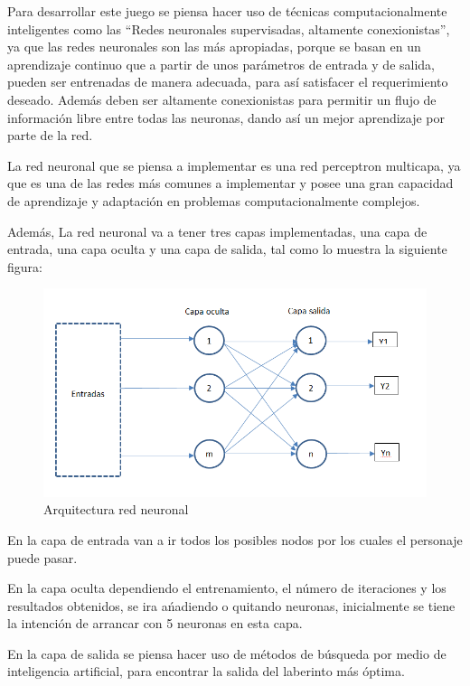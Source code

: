\documentclass{article}%
\begin{document}
Para desarrollar este juego se piensa hacer uso de  t\'ecnicas computacionalmente inteligentes  como las “Redes neuronales supervisadas, altamente conexionistas”, ya que  las redes neuronales son las m\'as apropiadas, porque se basan en un aprendizaje continuo que a partir de unos par\'ametros de entrada y de salida, pueden ser entrenadas de manera adecuada, para as\'i satisfacer el requerimiento deseado. Adem\'as deben ser  altamente conexionistas para permitir un flujo de informaci\'on libre entre todas las neuronas, dando as\'i un mejor aprendizaje por parte de la red.

La red neuronal que se piensa a implementar es una red perceptron multicapa, ya que es una de las redes m\'as comunes a implementar y posee una gran capacidad de aprendizaje y adaptaci\'on en problemas computacionalmente complejos.

Adem\'as, La red neuronal va a tener tres capas implementadas, una capa de entrada, una capa oculta y una capa de salida, tal como lo muestra la siguiente figura:

\begin{figure}[h]
\centering
\includegraphics[width=1\textwidth]{redes.png}
     \caption{Arquitectura red neuronal}
\end{figure}

En la capa de entrada van a ir todos los posibles nodos por los cuales el personaje puede pasar.

En la capa oculta dependiendo el entrenamiento, el n\'umero de iteraciones y los resultados obtenidos, se ira a\'nadiendo o quitando neuronas, inicialmente se tiene la intenci\'on de arrancar con 5 neuronas en esta capa.

En la capa de salida se piensa hacer uso de m\'etodos de b\'usqueda por medio de inteligencia artificial, para encontrar la salida del laberinto m\'as \'optima. 
\end{document}
